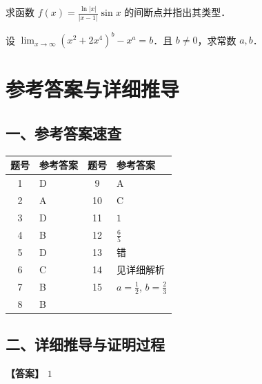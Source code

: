\documentclass[
  a4paper,
  11pt,
  title in boldface,
  theorem in new line,
  remove problem qed
]{homework}
\begin{document}
\begin{problem}
  求函数 $f(x) = \frac{\ln|x|}{|x-1|} \sin x$ 的间断点并指出其类型．

  \vspace{6.0cm}
\end{problem}

\begin{problem}
  设 $\lim_{x \to \infty} (x^2+2x^4)^b - x^a = b$．且 $b \ne 0$，求常数 $a, b$．

  \vspace{6.0cm}
\end{problem}

\clearpage
\section*{参考答案与详细推导}

\subsection*{一、参考答案速查}

\begin{center}
\begin{tabular}{c p{5.5cm} c p{5.5cm}}
  \toprule
  \textbf{题号} & \textbf{参考答案} & \textbf{题号} & \textbf{参考答案} \\
  \midrule
  1 & D & 9 & A \\
  2 & A & 10 & C \\
  3 & D & 11 & $1$ \\
  4 & B & 12 & $\frac{6}{5}$ \\
  5 & D & 13 & 错 \\
  6 & C & 14 & 见详细解析 \\
  7 & B & 15 & $a = \frac{1}{2}$, $b = \frac{2}{3}$ \\
  8 & B &  &  \\
  \bottomrule
\end{tabular}
\end{center}

\subsection*{二、详细推导与证明过程}

\begin{solution}[第 11 题解答]
  \textbf{【答案】} $1$

\end{solution}
\end{document}
